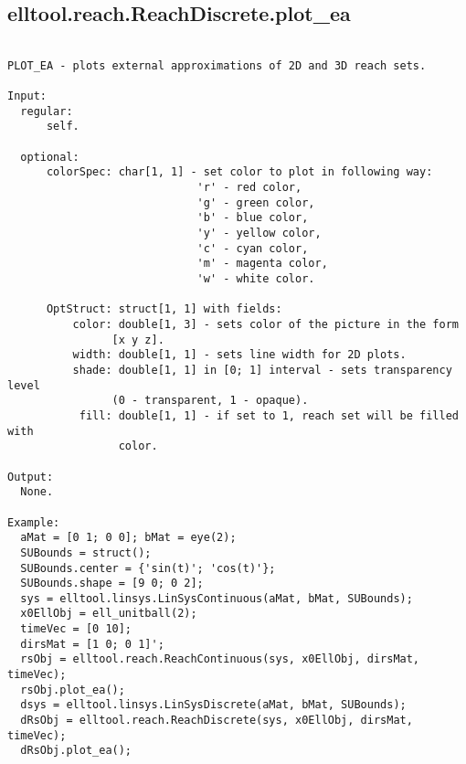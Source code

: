 \subsection{\texorpdfstring{elltool.reach.ReachDiscrete.plot\_ea}{plot\_ea}}\label{method:elltool.reach.ReachDiscrete.plotea}
\begin{verbatim}

PLOT_EA - plots external approximations of 2D and 3D reach sets.

Input:
  regular:
      self.

  optional:
      colorSpec: char[1, 1] - set color to plot in following way:
                             'r' - red color,
                             'g' - green color,
                             'b' - blue color,
                             'y' - yellow color,
                             'c' - cyan color,
                             'm' - magenta color,
                             'w' - white color.

      OptStruct: struct[1, 1] with fields:
          color: double[1, 3] - sets color of the picture in the form
                [x y z].
          width: double[1, 1] - sets line width for 2D plots.
          shade: double[1, 1] in [0; 1] interval - sets transparency level
                (0 - transparent, 1 - opaque).
           fill: double[1, 1] - if set to 1, reach set will be filled with
                 color.

Output:
  None.

Example:
  aMat = [0 1; 0 0]; bMat = eye(2);
  SUBounds = struct();
  SUBounds.center = {'sin(t)'; 'cos(t)'};
  SUBounds.shape = [9 0; 0 2];
  sys = elltool.linsys.LinSysContinuous(aMat, bMat, SUBounds);
  x0EllObj = ell_unitball(2);
  timeVec = [0 10];
  dirsMat = [1 0; 0 1]';
  rsObj = elltool.reach.ReachContinuous(sys, x0EllObj, dirsMat, timeVec);
  rsObj.plot_ea();
  dsys = elltool.linsys.LinSysDiscrete(aMat, bMat, SUBounds);
  dRsObj = elltool.reach.ReachDiscrete(sys, x0EllObj, dirsMat, timeVec);
  dRsObj.plot_ea();
\end{verbatim}
